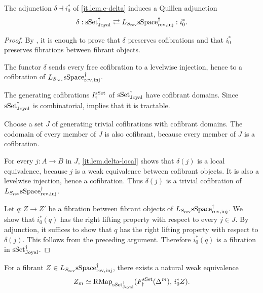 \documentclass[a4paper,dvipdfmx,11pt]{amsart}
\begin{document}
\begin{lemma}\label{jt.lem.star}
  The adjunction $\delta \dashv i_{0}^{*}$ of \cref{jt.lem.c-delta} induces a Quillen adjunction
  \begin{align}
    \delta:
    \mathrm{sSet}^{\dag}_{\mathrm{Joyal}}
    \rightleftarrows
    L_{S_{\mathrm{rev}}}\mathrm{sSpace}^{\dag}_{\mathrm{rev},\mathrm{inj}}
    :i_{0}^{*}.
  \end{align}
\end{lemma}

\begin{proof}
  By \cite[Proposition~7.15]{JT06}, it is enough to prove that $\delta$ preserves cofibrations and that $i_{0}^{*}$ preserves fibrations between fibrant objects.

  The functor $\delta$ sends every free cofibration to a levelwise injection, hence to a cofibration of $L_{S_{\mathrm{rev}}}\mathrm{sSpace}^{\dag}_{\mathrm{rev},\mathrm{inj}}$.

  The generating cofibrations $I^{\mathrm{sSet}}_{\dag}$ of $\mathrm{sSet}^{\dag}_{\mathrm{Joyal}}$ have cofibrant domains.
  Since $\mathrm{sSet}^{\dag}_{\mathrm{Joyal}}$ is combinatorial, \cite[Corollary~1.12]{Bar07} implies that it is tractable.
  
  Choose a set $J$ of generating trivial cofibrations with cofibrant domains.
  The codomain of every member of $J$ is also cofibrant, because every member of $J$ is a cofibration.

  For every $j:A\to B$ in $J$, \cref{jt.lem.delta-local} shows that $\delta(j)$ is a local equivalence, because $j$ is a weak equivalence between cofibrant objects.
  It is also a levelwise injection, hence a cofibration.
  Thus $\delta(j)$ is a trivial cofibration of $L_{S_{\mathrm{rev}}}\mathrm{sSpace}^{\dag}_{\mathrm{rev},\mathrm{inj}}$.
  
  Let $q:Z\to Z'$ be a fibration between fibrant objects of $L_{S_{\mathrm{rev}}}\mathrm{sSpace}^{\dag}_{\mathrm{rev},\mathrm{inj}}$.
  We show that $i_{0}^{*}(q)$ has the right lifting property with respect to every $j \in J$.
  By adjunction, it suffices to show that $q$ has the right lifting property with respect to $\delta(j)$.
  This follows from the preceding argument.
  Therefore $i_{0}^{*}(q)$ is a fibration in $\mathrm{sSet}^{\dag}_{\mathrm{Joyal}}$.
\end{proof}

\begin{lemma}\label{jt.lem.rows}
  For a fibrant $Z\in L_{S_{\mathrm{rev}}}\mathrm{sSpace}^{\dag}_{\mathrm{rev},\mathrm{inj}}$, there exists a natural weak equivalence
  \begin{align}
    Z_m
    \simeq \mathrm{RMap}_{\mathrm{sSet}^{\dag}_{\mathrm{Joyal}}}(F_{\dag}^{\mathrm{sSet}}(\Delta^m),\,i_{0}^{*}Z).
  \end{align}
\end{lemma}
\end{document}
